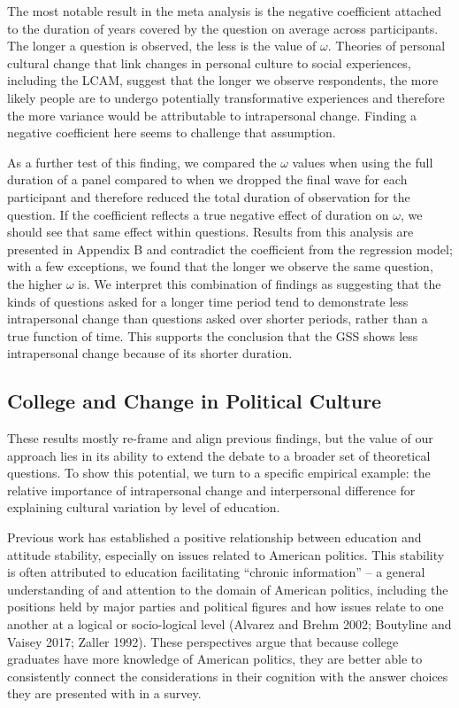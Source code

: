 \documentclass[
  12pt,
]{article}
\begin{document}
The most notable result in the meta analysis is the negative coefficient
attached to the duration of years covered by the question on average
across participants. The longer a question is observed, the less is the
value of \(\omega\). Theories of personal cultural change that link
changes in personal culture to social experiences, including the LCAM,
suggest that the longer we observe respondents, the more likely people
are to undergo potentially transformative experiences and therefore the
more variance would be attributable to intrapersonal change. Finding a
negative coefficient here seems to challenge that assumption.

As a further test of this finding, we compared the \(\omega\) values
when using the full duration of a panel compared to when we dropped the
final wave for each participant and therefore reduced the total duration
of observation for the question. If the coefficient reflects a true
negative effect of duration on \(\omega\), we should see that same
effect within questions. Results from this analysis are presented in
Appendix B and contradict the coefficient from the regression model;
with a few exceptions, we found that the longer we observe the same
question, the higher \(\omega\) is. We interpret this combination of
findings as suggesting that the kinds of questions asked for a longer
time period tend to demonstrate less intrapersonal change than questions
asked over shorter periods, rather than a true function of time. This
supports the conclusion that the GSS shows less intrapersonal change
because of its shorter duration.

\hypertarget{college-and-change-in-political-culture}{%
\subsection{College and Change in Political
Culture}\label{college-and-change-in-political-culture}}

These results mostly re-frame and align previous findings, but the value
of our approach lies in its ability to extend the debate to a broader
set of theoretical questions. To show this potential, we turn to a
specific empirical example: the relative importance of intrapersonal
change and interpersonal difference for explaining cultural variation by
level of education.

Previous work has established a positive relationship between education
and attitude stability, especially on issues related to American
politics. This stability is often attributed to education facilitating
``chronic information'' -- a general understanding of and attention to
the domain of American politics, including the positions held by major
parties and political figures and how issues relate to one another at a
logical or socio-logical level (Alvarez and Brehm 2002; Boutyline and
Vaisey 2017; Zaller 1992). These perspectives argue that because college
graduates have more knowledge of American politics, they are better able
to consistently connect the considerations in their cognition with the
answer choices they are presented with in a survey.
\end{document}
